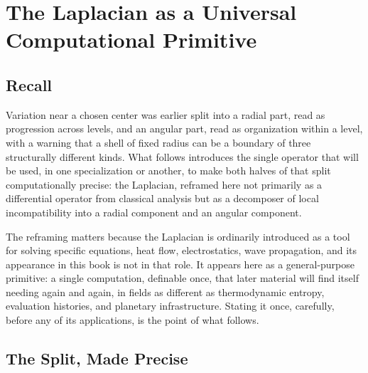 \documentclass[11pt,fleqn]{book}
\numberwithin{equation}{chapter}
\theoremstyle{plain}
\theoremstyle{definition}
\theoremstyle{remark}
\begin{document}

\chapter{The Laplacian as a Universal Computational Primitive}

\section{Recall}

Variation near a chosen center was earlier split into a radial part, read as progression across levels, and an angular part, read as organization within a level, with a warning that a shell of fixed radius can be a boundary of three structurally different kinds. What follows introduces the single operator that will be used, in one specialization or another, to make both halves of that split computationally precise: the Laplacian, reframed here not primarily as a differential operator from classical analysis but as a decomposer of local incompatibility into a radial component and an angular component.

The reframing matters because the Laplacian is ordinarily introduced as a tool for solving specific equations, heat flow, electrostatics, wave propagation, and its appearance in this book is not in that role. It appears here as a general-purpose primitive: a single computation, definable once, that later material will find itself needing again and again, in fields as different as thermodynamic entropy, evaluation histories, and planetary infrastructure. Stating it once, carefully, before any of its applications, is the point of what follows.

\section{The Split, Made Precise}
\end{document}
